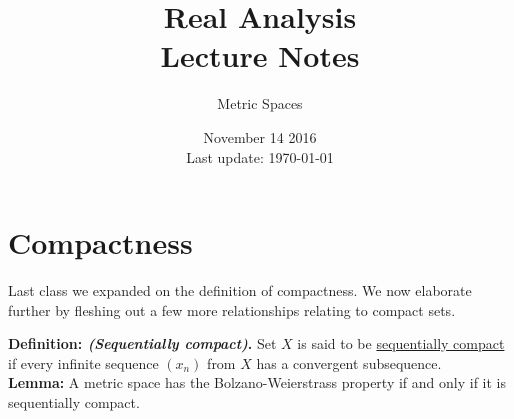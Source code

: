 \documentclass[12pt]{article}
\newlength\tindent
\renewcommand{\indent}{\hspace*{\tindent}}
\begin{document}
 
 
\title{Real Analysis\\Lecture Notes}
\author{Metric Spaces}
\date{November 14 2016 \\ Last update: \today{}}
\maketitle

\section{Compactness}

\indent Last class we expanded on the definition of compactness. We now elaborate further by fleshing out a few more relationships relating to compact sets.

%
%
{\bf Definition: {\em (Sequentially compact)}.} Set $X$ is said to be \underline{sequentially compact} if every infinite sequence $(x_n)$ from $X$ has a convergent subsequence. \\

%
%
{\bf Lemma:} A metric space has the Bolzano-Weierstrass property if and only if it is sequentially compact.
\end{document}
